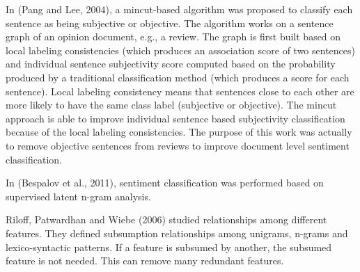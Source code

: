 

In (Pang and Lee, 2004), a mincut-based algorithm was proposed to
classify each sentence as being subjective or objective. The algorithm
works on a sentence graph of an opinion document, e.g., a review. The
graph is first built based on local labeling consistencies (which
produces an association score of two sentences) and individual
sentence subjectivity score computed based on the probability produced
by a traditional classification method (which produces a score for
each sentence). Local labeling consistency means that sentences close
to each other are more likely to have the same class label (subjective
or objective). The mincut approach is able to improve individual
sentence based subjectivity classification because of the local
labeling consistencies. The purpose of this work was actually to
remove objective sentences from reviews to improve document level
sentiment classification.













In (Bespalov et al., 2011), sentiment classification was performed
based on supervised latent n-gram analysis.



Riloff, Patwardhan and Wiebe (2006) studied relationships among
different features. They defined subsumption relationships among
unigrams, n-grams and lexico-syntactic patterns. If a feature is
subsumed by another, the subsumed feature is not needed. This can
remove many redundant features.


